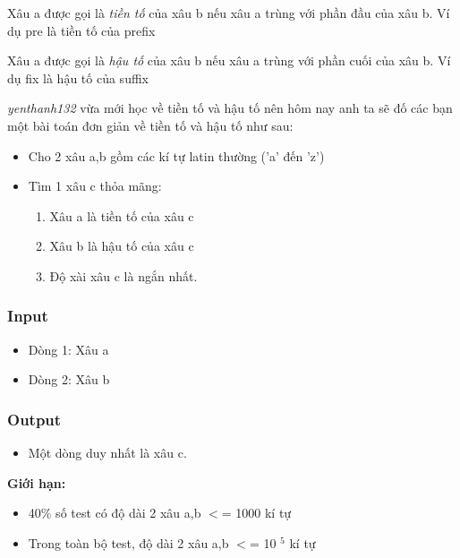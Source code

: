 



   Xâu a được gọi là   \emph{    tiền tố   }   của xâu b nếu xâu a trùng với phần đầu của xâu b. Ví dụ       pre      là tiền tố của       prefix   

   Xâu a được gọi là   \emph{    hậu tố   }   của xâu b nếu xâu a trùng với phần cuối của xâu b. Ví dụ       fix      là hậu tố của       suffix   

\emph{    yenthanh132   }   vừa mới học về tiền tố và hậu tố nên hôm nay anh ta sẽ đố các bạn một bài toán đơn giản về tiền tố và hậu tố như sau:  
\begin{itemize}
	\item     Cho 2 xâu a,b gồm các kí tự latin thường ('a' đến 'z')   
	\item     Tìm 1 xâu c thỏa mãng:    
\begin{enumerate}
	\item       Xâu a là tiền tố của xâu c     
	\item       Xâu b là hậu tố của xâu c     
	\item       Độ xài xâu c là ngắn nhất.     
\end{enumerate}
\end{itemize}
\begin{enumerate}
\end{enumerate}

\subsubsection{   Input  }
\begin{itemize}
	\item     Dòng 1: Xâu a   
	\item     Dòng 2: Xâu b   
\end{itemize}

\subsubsection{   Output  }
\begin{itemize}
	\item     Một dòng duy nhất là xâu c.   
\end{itemize}

\textbf{     Giới hạn:    }
\begin{itemize}
	\item     40\% số test có độ dài 2 xâu a,b $<$= 1000 kí tự   
	\item     Trong toàn bộ test, độ dài 2 xâu a,b $<$= 10    $^     5    $    kí tự   
\end{itemize}

